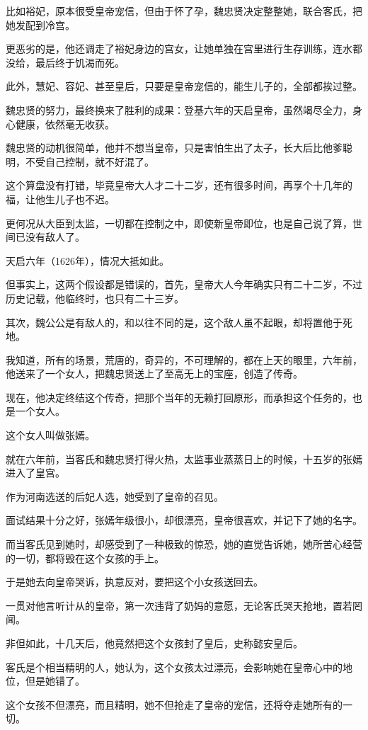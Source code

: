 \begin{multicols}{\theparacolNo}
		比如裕妃，原本很受皇帝宠信，但由于怀了孕，魏忠贤决定整整她，联合客氏，把她发配到冷宫。

		更恶劣的是，他还调走了裕妃身边的宫女，让她单独在宫里进行生存训练，连水都没给，最后终于饥渴而死。

		此外，慧妃、容妃、甚至皇后，只要是皇帝宠信的，能生儿子的，全部都挨过整。

		魏忠贤的努力，最终换来了胜利的成果：登基六年的天启皇帝，虽然竭尽全力，身心健康，依然毫无收获。

		魏忠贤的动机很简单，他并不想当皇帝，只是害怕生出了太子，长大后比他爹聪明，不受自己控制，就不好混了。

		这个算盘没有打错，毕竟皇帝大人才二十二岁，还有很多时间，再享个十几年的福，让他生儿子也不迟。

		更何况从大臣到太监，一切都在控制之中，即使新皇帝即位，也是自己说了算，世间已没有敌人了。

		天启六年（1626年），情况大抵如此。

		但事实上，这两个假设都是错误的，首先，皇帝大人今年确实只有二十二岁，不过历史记载，他临终时，也只有二十三岁。

		其次，魏公公是有敌人的，和以往不同的是，这个敌人虽不起眼，却将置他于死地。

		我知道，所有的场景，荒唐的，奇异的，不可理解的，都在上天的眼里，六年前，他送来了一个女人，把魏忠贤送上了至高无上的宝座，创造了传奇。

		现在，他决定终结这个传奇，把那个当年的无赖打回原形，而承担这个任务的，也是一个女人。

		这个女人叫做张嫣。

		就在六年前，当客氏和魏忠贤打得火热，太监事业蒸蒸日上的时候，十五岁的张嫣进入了皇宫。

		作为河南选送的后妃人选，她受到了皇帝的召见。

		面试结果十分之好，张嫣年级很小，却很漂亮，皇帝很喜欢，并记下了她的名字。

		而当客氏见到她时，却感受到了一种极致的惊恐，她的直觉告诉她，她所苦心经营的一切，都将毁在这个女孩的手上。

		于是她去向皇帝哭诉，执意反对，要把这个小女孩送回去。

		一贯对他言听计从的皇帝，第一次违背了奶妈的意愿，无论客氏哭天抢地，置若罔闻。

		非但如此，十几天后，他竟然把这个女孩封了皇后，史称懿安皇后。

		客氏是个相当精明的人，她认为，这个女孩太过漂亮，会影响她在皇帝心中的地位，但是她错了。

		这个女孩不但漂亮，而且精明，她不但抢走了皇帝的宠信，还将夺走她所有的一切。


\end{multicols}
